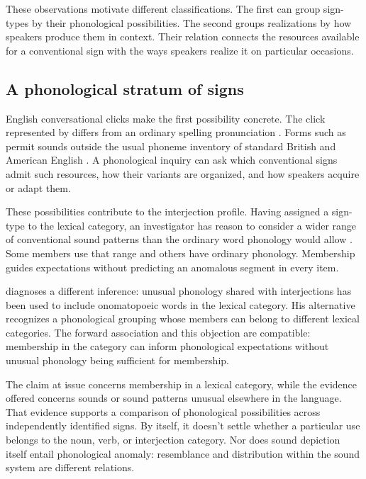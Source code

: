 \documentclass[12pt]{article}
\begin{document}
These observations motivate different classifications. The first can group
sign-types by their phonological possibilities. The second groups realizations
by how speakers produce them in context. Their relation connects
the resources available for a conventional sign with the ways speakers
realize it on particular occasions.

\subsection{A phonological stratum of signs}

English conversational clicks make the first possibility concrete. The
click represented by  differs from an ordinary spelling
pronunciation \citep[147]{wilkins1992}. Forms such as  permit
sounds outside the usual phoneme inventory of standard British and
American English \citep[74, 853]{quirk1985}. A phonological inquiry can
ask which conventional signs admit such resources, how their variants are
organized, and how speakers acquire or adapt them.

These possibilities contribute to the interjection profile. Having
assigned a sign-type to the lexical category, an investigator has reason to
consider a wider range of conventional sound patterns than the ordinary
word phonology would allow \citep[105--106]{ameka1992}. Some members
use that range and others have ordinary phonology. Membership guides
expectations without predicting an anomalous segment in every item.

\textcite[112--113]{ameka1992} diagnoses a different inference: unusual
phonology shared with interjections has been used to include onomatopoeic
words in the lexical category. His alternative recognizes a phonological
grouping whose members can belong to different lexical categories. The
forward association and this objection are compatible: membership in the
category can inform phonological expectations without unusual phonology
being sufficient for membership.

The claim at issue concerns membership in a lexical category, while the
evidence offered concerns sounds or sound patterns unusual elsewhere in
the language. That evidence supports a comparison of phonological
possibilities across independently identified signs. By itself, it doesn't
settle whether a particular use belongs to the noun, verb, or interjection
category. Nor does sound depiction itself entail phonological anomaly: resemblance
and distribution within the sound system are different relations.
\end{document}
